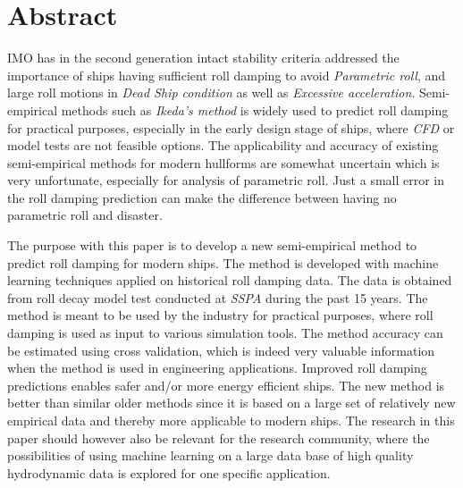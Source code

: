 \section{Abstract}
\label{se:abstract}
IMO has in the second generation intact stability criteria addressed the importance of ships having sufficient roll damping to avoid \emph{Parametric roll}, and large roll motions in \emph{Dead Ship condition} as well as \emph{Excessive acceleration}. Semi-empirical methods such as \emph{Ikeda's method} is widely used to predict roll damping for practical purposes, especially in the early design stage of ships, where \emph{CFD} or model tests are not feasible options. The applicability and accuracy of existing semi-empirical methods for modern hullforms are somewhat uncertain which is very unfortunate, especially for analysis of parametric roll. Just a small error in the roll damping prediction can make the difference between having no parametric roll and disaster.

The purpose with this paper is to develop a new semi-empirical method to predict roll damping for modern ships. The method is developed with machine learning techniques applied on historical roll damping data. The data is obtained from roll decay model test conducted at \emph{SSPA} during the past 15 years. The method is meant to be used by the industry for practical purposes, where roll damping is used as input to various simulation tools. The method accuracy can be estimated using cross validation, which is indeed very valuable information when the method is used in engineering applications. Improved roll damping predictions enables safer and/or more energy efficient ships.
The new method is better than similar older methods since it is based on a large set of relatively new empirical data and thereby more applicable to modern ships.
The research in this paper should however also be relevant for the research community, where the possibilities of using machine learning on a large data base of high quality hydrodynamic data is explored for one specific application.

\newpage